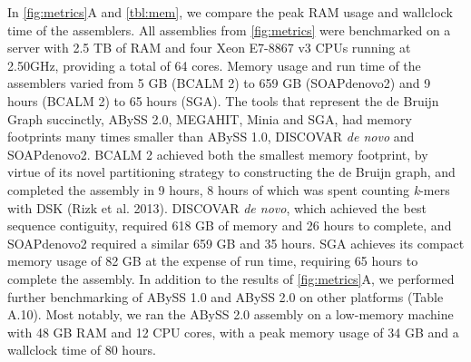 \documentclass[
  12pt,
  oneside,
  openany]{book}
\begin{document}
In \cref{fig:metrics}A and \cref{tbl:mem}, we compare the peak RAM usage and wallclock time of the assemblers. All assemblies from \cref{fig:metrics} were benchmarked on a server with 2.5 TB of RAM and four Xeon E7-8867 v3 CPUs running at 2.50GHz, providing a total of 64 cores. Memory usage and run time of the assemblers varied from 5 GB (BCALM 2) to 659 GB (SOAPdenovo2) and 9 hours (BCALM 2) to 65 hours (SGA). The tools that represent the de Bruijn Graph succinctly, ABySS 2.0, MEGAHIT, Minia and SGA, had memory footprints many times smaller than ABySS 1.0, DISCOVAR \emph{de novo} and SOAPdenovo2. BCALM 2 achieved both the smallest memory footprint, by virtue of its novel partitioning strategy to constructing the de Bruijn graph, and completed the assembly in 9 hours, 8 hours of which was spent counting \emph{k}-mers with DSK (Rizk et al. 2013). DISCOVAR \emph{de novo}, which achieved the best sequence contiguity, required 618 GB of memory and 26 hours to complete, and SOAPdenovo2 required a similar 659 GB and 35 hours. SGA achieves its compact memory usage of 82 GB at the expense of run time, requiring 65 hours to complete the assembly. In addition to the results of \cref{fig:metrics}A, we performed further benchmarking of ABySS 1.0 and ABySS 2.0 on other platforms (Table A.10). Most notably, we ran the ABySS 2.0 assembly on a low-memory machine with 48 GB RAM and 12 CPU cores, with a peak memory usage of 34 GB and a wallclock time of 80 hours.
\end{document}
